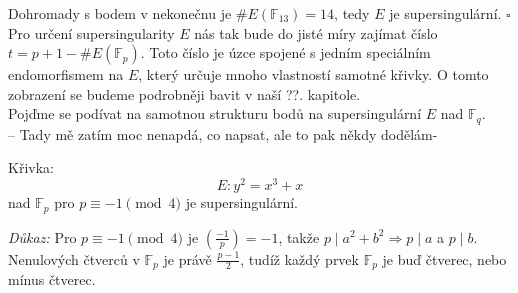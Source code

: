 \documentclass [12pt]{report}
\begin{document}



Dohromady s bodem v nekonečnu je $\#E(\mathbb{F}_{13}) = 14$, tedy $E$ je supersingulární. \hfill $\square$ \\


Pro určení supersingularity $E$ nás tak bude do jisté míry zajímat číslo $t = p+1 - \# E(\mathbb{F}_p)$. Toto číslo je úzce spojené s jedním speciálním endomorfismem na $E$, který určuje mnoho vlastností samotné křivky. O tomto zobrazení se budeme podrobněji bavit v naší ??. kapitole.\\

Pojďme se podívat na samotnou strukturu bodů na supersingulární $E$ nad $\mathbb{F}_q$. \\
 
-- Tady mě zatím moc nenapdá, co napsat, ale to pak někdy dodělám-
\begin{veta}
Křivka:
 $$E : y^2 = x^3 + x$$
nad $\mathbb{F}_{p}$ pro $ p \equiv -1 \pmod{4}$ je supersingulární.
\end{veta}
\textit{Důkaz: } Pro $p \equiv -1 \pmod{4}$ je $\genfrac{(}{)}{}{}{-1}{p} = -1$, takže $p \mid a^2 + b^2 \Rightarrow p \mid a$ a $p \mid b$. Nenulových čtverců v $\mathbb{F}_p$ je právě $\frac{p-1}{2}$, tudíž každý prvek $\mathbb{F}_p$ je buď čtverec, nebo mínus čtverec.\\
\end{document}
